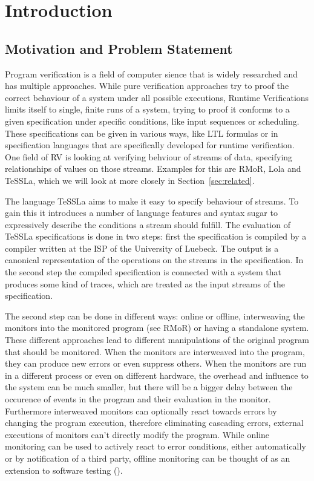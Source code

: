 %
\chapter{Introduction}
\label{sec:intro}



\section{Motivation and Problem Statement}
\label{sec:intro:motivation}

Program verification is a field of computer sience that is widely researched and has multiple approaches.
While pure verification approaches try to proof the correct behaviour of a system under all possible executions,
Runtime Verifications limits itself to single, finite runs of a system, trying to proof it conforms to a given specification
under specific conditions, like input sequences or scheduling.
These specifications can be given in various ways, like LTL formulas or in specification languages that are specifically developed for
runtime verification.
One field of RV is looking at verifying behviour of streams of data, specifying relationships of values on those streams.
Examples for this are RMoR, Lola and TeSSLa, which we will look at more closely in Section~\ref{sec:related}.

The language TeSSLa aims to make it easy to specify behaviour of streams.
To gain this it introduces a number of language features and syntax sugar to expressively describe the conditions a stream should fulfill.
The evaluation of TeSSLa specifications is done in two steps: first the specification is compiled by a compiler written at the ISP of the University of Luebeck.
The output is a canonical representation of the operations on the streams in the specification.
In the second step the compiled specification is connected with a system that produces some kind of traces, which are treated as the input streams of the specification.

The second step can be done in different ways: online or offline, interweaving the monitors into the monitored program (see RMoR) or having a standalone system.
These different approaches lead to different manipulations of the original program that should be monitored.
When the monitors are interweaved into the program, they can produce new errors or even suppress others.
When the monitors are run in a different process or even on different hardware, the overhead and influence to the system can be much smaller,
but there will be a bigger delay between the occurence of events in the program and their evaluation in the monitor.
Furthermore interweaved monitors can optionally react towards errors by changing the program execution, therefore eliminating cascading errors,
external executions of monitors can't directly modify the program.
While online monitoring can be used to actively react to error conditions, either automatically or by notification of a third party,
offline monitoring can be thought of as an extension to software testing (\cite{DAngelo2005}).

